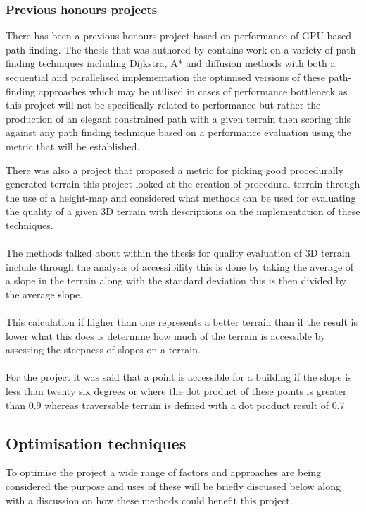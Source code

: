 \subsubsection{Previous honours projects}
There has been a previous honours project based on performance of GPU based path-finding. The thesis that was authored by \cite{honours} contains work on a variety of path-finding techniques including Dijkstra, A* and diffusion methods with both a sequential and parallelised implementation the optimised versions of these path-finding approaches which may be utilised in cases of performance bottleneck as this project will not be specifically related to performance but rather the production of an elegant constrained path with a given terrain then scoring this against any path finding technique based on a performance evaluation using the metric that will be established.


There was also a project that proposed a metric for picking good procedurally generated terrain this project looked at the creation of procedural terrain through the use of a height-map and considered what methods can be used for evaluating the quality of a given 3D terrain with descriptions on the implementation of these techniques.\\\\The methods talked about within the thesis \cite{honours2} for quality evaluation of 3D terrain include through the analysis of accessibility this is done by taking the average of a slope in the terrain along with the standard deviation this is then divided by the average slope.\\\\This calculation if higher than one represents a better terrain than if the result is lower what this does is determine how much of the terrain is accessible by assessing the steepness of slopes on a terrain.\\\\For the project \cite{honours2} it was said that a point is accessible for a building if the slope is less than twenty six degrees or where the dot product of these points is greater than 0.9 whereas traversable terrain is defined with a dot product result of 0.7  

\subsection{Optimisation techniques}
To optimise the project a wide range of factors and approaches are being considered the purpose and uses of these will be briefly discussed below along with a discussion on how these methods could benefit this project.\\

